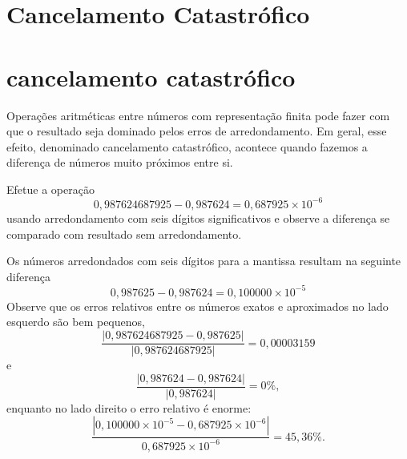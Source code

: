 \documentclass[main.tex]{subfiles}
\begin{document}
\section{Cancelamento Catastrófico}\section{cancelamento catastrófico}
Operações aritméticas entre números com representação finita pode fazer com que o resultado seja dominado pelos erros de arredondamento. Em geral, esse efeito, denominado cancelamento catastrófico, acontece quando fazemos a diferença de números muito próximos entre si.

\begin{ex}Efetue a operação
  \begin{equation*}
    0,987624687925-0,987624=0,687925\times 10^{-6}    
  \end{equation*}
usando arredondamento com seis dígitos significativos e observe a diferença se comparado com resultado sem arredondamento.
\end{ex}
\begin{sol}
Os números arredondados com seis dígitos para a mantissa resultam na seguinte diferença
$$
0,987625-0,987624=0,100000\times 10^{-5}
$$
Observe que os erros relativos entre os números exatos e aproximados no lado esquerdo são bem pequenos,
\begin{equation*}
  \frac{|0,987624687925-0,987625|}{|0,987624687925|}=0,00003159  
\end{equation*}
e
\begin{equation*}
  \frac{|0,987624-0,987624|}{|0,987624|}=0\%,
\end{equation*}
enquanto no lado direito o erro relativo é enorme:
\begin{equation*}
\frac{|0,100000\times 10^{-5}-0,687925\times 10^{-6}|}{0,687925\times 10^{-6}}=45,36\%.  
\end{equation*}
\end{sol}
\end{document}
